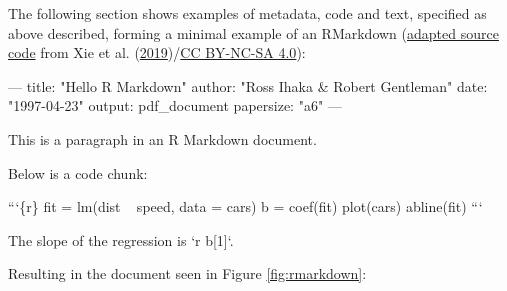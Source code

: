 \documentclass[12pt,a4paper,]{article}
\newenvironment{Shaded}{\begin{snugshade}}{\end{snugshade}}
\newcommand{\AttributeTok}[1]{\textcolor[rgb]{0.77,0.63,0.00}{#1}}
\newcommand{\BaseNTok}[1]{\textcolor[rgb]{0.00,0.00,0.81}{#1}}
\newcommand{\FunctionTok}[1]{\textcolor[rgb]{0.00,0.00,0.00}{#1}}
\newcommand{\NormalTok}[1]{#1}
\newcommand{\OtherTok}[1]{\textcolor[rgb]{0.56,0.35,0.01}{#1}}
\newcommand{\StringTok}[1]{\textcolor[rgb]{0.31,0.60,0.02}{#1}}
\begin{document}
The following section shows examples of metadata, code and text, specified as above described, forming a minimal example of an RMarkdown (\href{https://github.com/rstudio/rmarkdown-book/blob/a10b33d47a2b223a8ef643c245d45e4dfc7091b8/02-basics.Rmd\#L15-L39}{adapted source code} from Xie et al. (\protect\hyperlink{ref-xieMarkdownDefinitiveGuide2019}{2019})/\href{https://creativecommons.org/licenses/by-nc-sa/4.0/}{CC BY-NC-SA 4.0}):

\begin{Shaded}
\begin{Highlighting}[]
\OtherTok{---}
\FunctionTok{title:}\AttributeTok{ }\StringTok{"Hello R Markdown"}
\FunctionTok{author:}\AttributeTok{ }\StringTok{"Ross Ihaka & Robert Gentleman"}
\FunctionTok{date:}\AttributeTok{ }\StringTok{"1997-04-23"}
\FunctionTok{output:}\AttributeTok{ pdf_document}
\FunctionTok{papersize:}\AttributeTok{ }\StringTok{"a6"}
\OtherTok{---}
\end{Highlighting}
\end{Shaded}

\begin{Shaded}
\begin{Highlighting}[]
\NormalTok{This is a paragraph in an R Markdown document.}

\NormalTok{Below is a code chunk:}

\BaseNTok{```\{r\}}
\BaseNTok{fit = lm(dist ~ speed, data = cars)}
\BaseNTok{b   = coef(fit)}
\BaseNTok{plot(cars)}
\BaseNTok{abline(fit)}
\BaseNTok{```}

\NormalTok{The slope of the regression is }\BaseNTok{`r b[1]`}\NormalTok{.}
\end{Highlighting}
\end{Shaded}

Resulting in the document seen in Figure \ref{fig:rmarkdown}:
\end{document}
